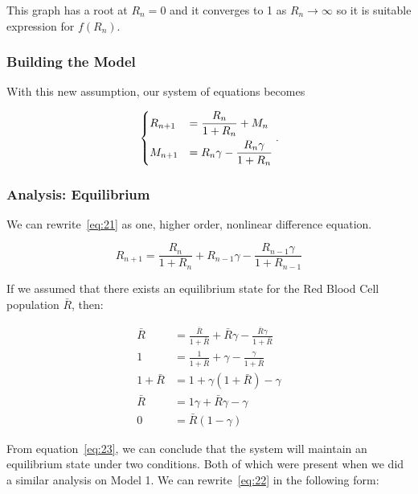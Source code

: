 This graph has a root at $R_n=0$ and it converges to 1 as $R_n\to\infty$ so it is suitable expression for $f(R_n)$.

\subsubsection{Building the Model}

With this new assumption, our system of equations becomes

\begin{equation}
    \begin{dcases}
        R_{n+1} &= \frac{R_n}{1 + R_n} + M_n\\
        M_{n+1} &= R_n\gamma-\frac{R_n\gamma}{1+R_n}
    \end{dcases}.
    \label{eq:21}
\end{equation}

\subsubsection{Analysis: Equilibrium}

We can rewrite~\eqref{eq:21} as one, higher order, nonlinear difference equation.

\begin{equation}
    R_{n+1} = \frac{R_n}{1 + R_n} + R_{n-1}\gamma-\frac{R_{n-1}\gamma}{1+R_{n-1}}
    \label{eq:22}
\end{equation}

If we assumed that there exists an equilibrium state for the Red Blood Cell population $\bar{R}$, then:

\begin{align}
     \bar{R} &= \frac{\bar{R}}{1 + \bar{R}} + \bar{R}\gamma - \frac{\bar{R}\gamma}{1+\bar{R}} \nonumber\\
     1 &= \frac{1}{1 + \bar{R}} + \gamma - \frac{\gamma}{1+\bar{R}} \nonumber\\
     1 + \bar{R} &= 1 + \gamma(1 + \bar{R}) - \gamma \nonumber\\
     \bar{R} &= 1\gamma + \bar{R}\gamma - \gamma \nonumber\\
     0 &= \bar{R}(1-\gamma) \label{eq:23}
\end{align}

From equation~\eqref{eq:23}, we can conclude that the system will maintain an equilibrium state under two conditions. Both of which were present when we did a similar analysis on Model 1. We can rewrite~\eqref{eq:22} in the following form:


